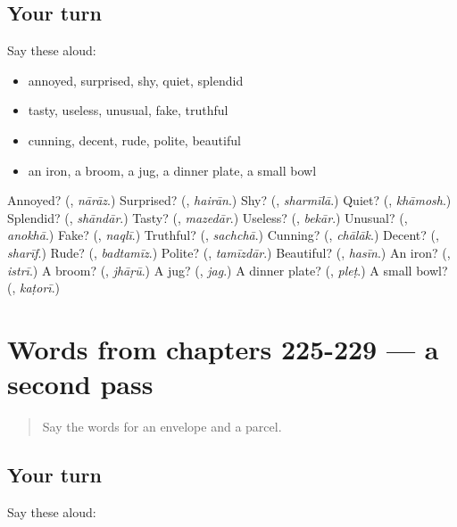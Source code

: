 \subsection*{Your turn}
Say these aloud:

\begin{itemize}
\raggedright
  \item annoyed, surprised, shy, quiet, splendid
  \item tasty, useless, unusual, fake, truthful
  \item cunning, decent, rude, polite, beautiful
  \item an iron, a broom, a jug, a dinner plate, a small bowl
\end{itemize}

\begin{tcolorbox}[breakable,colback=teal!4,colframe=teal!35!black,title={Before you move on}]
Annoyed? (\textbf{}, \emph{nārāz}.) Surprised? (\textbf{}, \emph{hairān}.) Shy? (\textbf{}, \emph{sharmīlā}.) Quiet? (\textbf{}, \emph{khāmosh}.) Splendid? (\textbf{}, \emph{shāndār}.) Tasty? (\textbf{}, \emph{mazedār}.) Useless? (\textbf{}, \emph{bekār}.) Unusual? (\textbf{}, \emph{anokhā}.) Fake? (\textbf{}, \emph{naqlī}.) Truthful? (\textbf{}, \emph{sachchā}.) Cunning? (\textbf{}, \emph{chālāk}.) Decent? (\textbf{}, \emph{sharīf}.) Rude? (\textbf{}, \emph{badtamīz}.) Polite? (\textbf{}, \emph{tamīzdār}.) Beautiful? (\textbf{}, \emph{hasīn}.) An iron? (\textbf{}, \emph{istrī}.) A broom? (\textbf{}, \emph{jhāṛū}.) A jug? (\textbf{}, \emph{jag}.) A dinner plate? (\textbf{}, \emph{pleṭ}.) A small bowl? (\textbf{}, \emph{kaṭorī}.)
\end{tcolorbox}
\section[(dialogue)]{Words from chapters 225-229 — a second pass}

\label{lesson:UR-R229-second-pass-words-from-chapters-225-229}



\begin{quote}
Say the words for an envelope and a parcel.
\end{quote}

\subsection*{Your turn}
Say these aloud:

